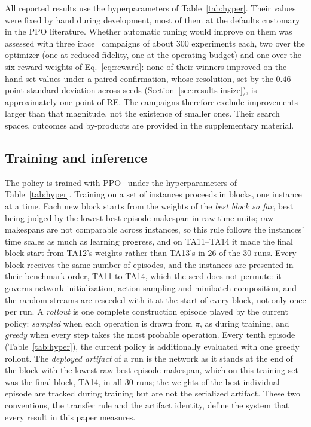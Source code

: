 \documentclass[preprint,12pt]{elsarticle}
\theoremstyle{definition}
\theoremstyle{remark}
\begin{document}
All reported results use the hyperparameters of
Table~\ref{tab:hyper}. Their values were fixed by hand during
development, most of them at the defaults customary in the PPO
literature. Whether automatic tuning would improve on them was
assessed with three irace~\citep{LopezIbanez2016} campaigns of about
$300$ experiments each, two over the optimizer (one at reduced
fidelity, one at the operating budget) and one over the six reward
weights of Eq.~\eqref{eq:reward}: none of their winners improved on
the hand-set values under a paired confirmation, whose resolution,
set by the $0.46$-point standard deviation across seeds
(Section~\ref{sec:results-insize}), is approximately one point of RE.
The campaigns therefore exclude improvements larger than that
magnitude, not the existence of smaller ones. Their search spaces,
outcomes and by-products are provided in the supplementary
material.

\subsection{Training and inference}
\label{sec:training}

The policy is trained with PPO~\citep{Schulman2017} under the
hyperparameters of Table~\ref{tab:hyper}. Training on a set of
instances proceeds in blocks, one instance at a time. Each new block
starts from the weights of the \emph{best block so far}, best being
judged by the lowest best-episode makespan in raw time units; raw
makespans are not comparable across instances, so this rule follows
the instances' time scales as much as learning progress, and on
TA11--TA14 it made the final block start from TA12's weights rather
than TA13's in 26 of the 30 runs. Every block receives the same
number of episodes, and the instances are presented in their
benchmark order, TA11 to TA14, which the seed does not permute: it
governs network initialization, action sampling and minibatch
composition, and the random streams are reseeded with it at the start
of every block, not only once per run.
A \emph{rollout} is one complete construction episode
played by the current policy: \emph{sampled} when each operation is
drawn from $\pi$, as during training, and \emph{greedy} when every
step takes the most probable operation. Every tenth episode
(Table~\ref{tab:hyper}), the current policy is additionally evaluated
with one greedy rollout. The \emph{deployed artifact} of a run is
the network as it stands at the end of the block with the lowest raw
best-episode makespan, which on this training set was the final
block, TA14, in all 30 runs; the weights of the best individual
episode are tracked during training but are not the serialized
artifact. These two conventions, the transfer rule and the artifact
identity, define the system that every result in this paper
measures.
\end{document}
